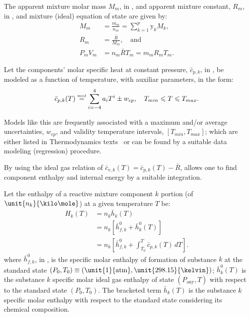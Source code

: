     The apparent mixture molar mass $M_m$, in \kilogram\per\kilo\mole, and apparent mixture constant, $R_m$, in \kilo\joule\per\kilogram\usk\kelvin, and mixture (ideal) equation of  state  are
    given by:%
    \begin{align}
        \label{eq:Mm}
        M_m         &= \frac{m_m}{n_m} = \sum_{k=1}^p \mathrm{y}_k M_k, \\
        \label{eq:Rm}
        R_m         &= \frac{\bar{R}}{M_m}, \quad\mbox{and} \\
        \label{eq:mEoS}
        P_mV_m      &= n_m\bar{R}T_m = m_mR_mT_m.
    \end{align}

    Let the components' molar specific heat at constant pressure, $\bar{c}_{p,k}$, in \kilo\joule\per\kilo\mole\usk\kelvin, be modeled as a function of temperature, with  auxiliar  parameters,
    in the form:%
    \begin{equation}
        \bar{c}_{p,k}(T) \stackrel{\text{{\tiny mod}}}{=} \sum_{i=-4}^4 a_iT^i \pm w_{cp}, \quad T_{min} \leqslant T \leqslant T_{max}.
        \label{eq:cp}
    \end{equation}

    Models like this are frequently associated with a maximum and/or average uncertainties, $w_{cp}$, and validity temperature intervals, $[T_{min},  T_{max}]$;  which  are  either  listed  in
    Thermodynamics texts~\cite{2014-CengelYA+BolesMA-McGrawHill, 1985-WylenG-Wiley} or can be found by a suitable data modeling (regression) procedure.

    By using the ideal gas relation of $\bar{c}_{v,k}(T) = \bar{c}_{p,k}(T) - \bar{R}$, allows one to find component enthalpy and internal energy by a suitable integration.

    Let the enthalpy of a reactive mixture component $k$ portion (of $\unit{n_k}{\kilo\mole}$) at a given temperature $T$ be:%
    \begin{align}
        H_k(T)      &= n_k\bar{h}_k(T) \nonumber\\
                    &= n_k[\bar{h}^0_{f,k} + \bar{h}^0_k(T)] \nonumber\\
                    &= n_k\left[
                        \bar{h}^0_{f,k} + \int_{T_0}^T \bar{c}_{p,k}(T)\,dT
                    \right].
        \label{eq:H.comp}
    \end{align}
    \noindent  where  $\bar{h}^0_{f,k}$,  in  \kilo\joule\per\kilo\mole,  is  the  specific  molar  enthalpy  of  formation  of  substance  $k$  at  the  standard  state  $(P_0,  T_0)   \equiv
    (\unit{1}{\mathrm{atm}}, \unit{298.15}{\kelvin})$; $\bar{h}^0_k(T)$ is the substance $k$ specific molar ideal gas enthalpy of state $(P_{\mathrm{any}}, T)$ with  respect  to  the  standard
    state $(P_0, T_0)$. The bracketed term $\bar{h}_k(T)$ is the substance $k$ specific molar enthalpy with respect to the standard state considering its chemical composition.


